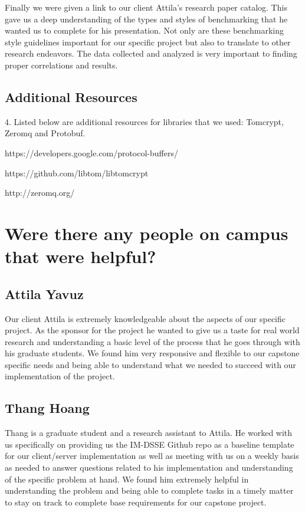 Finally we were given a link to our client Attila’s research paper catalog. This gave us a deep understanding of the types and styles of benchmarking that he wanted us to complete for his presentation. Not only are these benchmarking style guidelines important for our specific project but also to translate to other research endeavors. The data collected and analyzed is very important to finding proper correlations and results.

\subsection{Additional Resources}
4. Listed below are additional resources for libraries that we used: Tomcrypt, Zeromq and Protobuf.

https://developers.google.com/protocol-buffers/

https://github.com/libtom/libtomcrypt

http://zeromq.org/
 
\section {Were there any people on campus that were helpful?}
\subsection{Attila Yavuz}
Our client Attila is extremely knowledgeable about the aspects of our specific project. As the sponsor for the project he wanted to give us a taste for real world research and understanding a basic level of the process that he goes through with his graduate students. We found him very responsive and flexible to our capstone specific needs and being able to understand what we needed to succeed with our implementation of the project.

\subsection{Thang Hoang}
Thang is a graduate student and a research assistant to Attila. He worked with us specifically on providing us the IM-DSSE Github repo as a baseline template for our client/server implementation as well as meeting with us on a weekly basis as needed to answer questions related to his implementation and understanding of the specific problem at hand. We found him extremely helpful in understanding the problem and being able to complete tasks in a timely matter to stay on track to complete base requirements for our capstone project.
